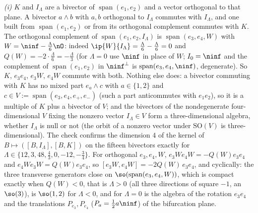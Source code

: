 \emph{(i)} $K$ and $I_{\Lambda}$ are a bivector of $\operatorname{span}(e_{1}, e_{2})$ and a vector orthogonal to that plane. A bivector $a \wedge b$ with $a, b$ orthogonal to $I_{\Lambda}$ commutes with $I_{\Lambda}$, and one built from $\operatorname{span}(e_{1}, e_{2})$ or from its orthogonal complement commutes with $K$. The orthogonal complement of $\operatorname{span}(e_{1}, e_{2}, I_{\Lambda})$ is $\operatorname{span}(e_{3}, e_{4}, W)$ with $W = \ninf - \tfrac{\Lambda}{6}\nO$: indeed $\ip{W}{I_{\Lambda}} = \tfrac{\Lambda}{6} - \tfrac{\Lambda}{6} = 0$ and $Q(W) = -2\cdot\tfrac{\Lambda}{6} = -\tfrac{\Lambda}{3}$ (for $\Lambda = 0$ use $\ninf$ in place of $W$; $I_{0} = \ninf$ and the complement of $\operatorname{span}(e_{1}, e_{2})$ in $\ninf^{\perp}$ is $\operatorname{span}(e_{3}, e_{4}, \ninf)$, degenerate). So $K$, $e_{3}e_{4}$, $e_{3}W$, $e_{4}W$ commute with both. Nothing else does: a bivector commuting with $K$ has no mixed part $e_{a} \wedge c$ with $a \in \{1, 2\}$ and $c \in V := \operatorname{span}(e_{3}, e_{4}, e_{+}, e_{-})$ (such a part anticommutes with $e_{1}e_{2}$), so it is a multiple of $K$ plus a bivector of $V$; and the bivectors of the nondegenerate four-dimensional $V$ fixing the nonzero vector $I_{\Lambda} \in V$ form a three-dimensional algebra, whether $I_{\Lambda}$ is null or not (the orbit of a nonzero vector under $\mathrm{SO}(V)$ is three-dimensional). The check confirms the dimension $4$ of the kernel of $B \mapsto ([B, I_{\Lambda}], [B, K])$ on the fifteen bivectors exactly for $\Lambda \in \{12, 3, 48, \tfrac43, 0, -12, -\tfrac34\}$. For orthogonal $e_{3}, e_{4}, W$, $e_{3}We_{4}W = -Q(W)e_{3}e_{4}$ and $e_{4}We_{3}W = Q(W)e_{3}e_{4}$, so $[e_{3}W, e_{4}W] = -2Q(W)\,e_{3}e_{4}$, and cyclically: the three transverse generators close on $\so(\operatorname{span}(e_{3}, e_{4}, W))$, which is compact exactly when $Q(W) < 0$, that is $\Lambda > 0$ (all three directions of square $-1$, an $\so(3)$), is $\so(1,2)$ for $\Lambda < 0$, and for $\Lambda = 0$ is the algebra of the rotation $e_{3}e_{4}$ and the translations $P_{e_{3}}, P_{e_{4}}$ ($P_{a} = \tfrac12 a\ninf$) of the bifurcation plane.


